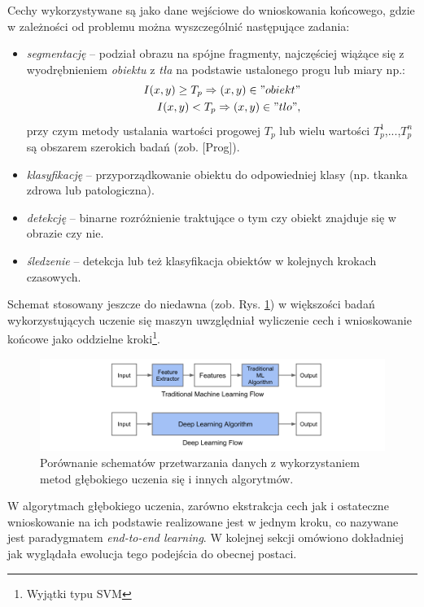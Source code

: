 Cechy wykorzystywane są jako dane wejściowe do wnioskowania końcowego, gdzie w zależności od problemu można wyszczególnić następujące zadania:
\begin{itemize}
	\item \textit{segmentację} -- podział obrazu na spójne fragmenty, najczęściej wiążące się z wyodrębnieniem \textit{obiektu} z \textit{tła} na podstawie ustalonego progu lub miary np.:
	\begin{equation*}
	\begin{aligned}
	I(x,y) \geq T_p \Rightarrow (x,y) \in "obiekt" \\
	I(x,y) < T_p \Rightarrow (x,y) \in "tlo",
	\end{aligned}
	\end{equation*} 
	przy czym metody ustalania wartości progowej $T_p$ lub wielu wartości {$T_p^1$,...,$T_p^n$} są obszarem szerokich badań (zob. [Prog]).
	\item \textit{klasyfikację} -- przyporządkowanie obiektu do odpowiedniej klasy (np. tkanka zdrowa lub patologiczna).
	\item \textit{detekcję} -- binarne rozróżnienie traktujące o tym czy obiekt znajduje się w obrazie czy nie.
	\item \textit{śledzenie} -- detekcja lub też klasyfikacja obiektów w kolejnych krokach czasowych.
\end{itemize} 

Schemat stosowany jeszcze do niedawna (zob. Rys. \ref{DLworkflow}) w większości badań wykorzystujących uczenie się maszyn uwzględniał  wyliczenie cech i wnioskowanie końcowe jako oddzielne kroki\footnote{Wyjątki typu SVM}.
\begin{figure}[h!]
	\centering
	\includegraphics[width=1\textwidth]{figures/DLworkflow.png}
	\caption{Porównanie schematów przetwarzania danych z wykorzystaniem metod głębokiego uczenia się i innych algorytmów.}
	\label{DLworkflow}
\end{figure}

W algorytmach głębokiego uczenia, zarówno ekstrakcja cech jak i ostateczne wnioskowanie na ich podstawie realizowane jest w jednym kroku, co nazywane jest paradygmatem \textit{end-to-end learning}. W kolejnej sekcji omówiono dokładniej jak wyglądała ewolucja tego podejścia do obecnej postaci. 

